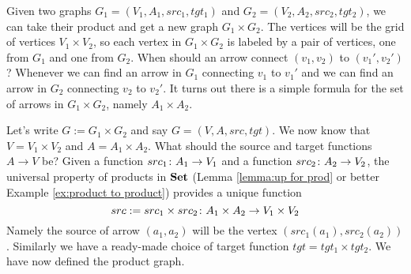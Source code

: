 \begin{example}\label{ex:product of graphs}
Given two graphs $G_1=(V_1,A_1,src_1,tgt_1)$ and $G_2=(V_2,A_2,src_2,tgt_2)$, we can take their product and get a new graph $G_1\times G_2$. The vertices will be the grid of vertices $V_1\times V_2$, so each vertex in $G_1\times G_2$ is labeled by a pair of vertices, one from $G_1$ and one from $G_2$. When should an arrow connect $(v_1,v_2)$ to $(v_1',v_2')$? Whenever we can find an arrow in $G_1$ connecting $v_1$ to $v_1'$ and we can find an arrow in $G_2$ connecting $v_2$ to $v_2'$. It turns out there is a simple formula for the set of arrows in $G_1\times G_2$, namely $A_1\times A_2$.

Let's write $G:=G_1\times G_2$ and say $G=(V,A,src,tgt)$. We now know that $V=V_1\times V_2$ and $A=A_1\times A_2$. What should the source and target functions $A\to V$ be? Given a function $src_1\colon A_1\rightarrow V_1$ and a function $src_2\colon A_2\rightarrow V_2$, the universal property of products in ${\bf Set}$ (Lemma \ref{lemma:up for prod} or better Example \ref{ex:product to product}) provides a unique function 
$$src:=src_1\times src_2\colon A_1\times A_2\rightarrow V_1\times V_2$$ 
Namely the source of arrow $(a_1,a_2)$ will be the vertex $(src_1(a_1),src_2(a_2))$. Similarly we have a ready-made choice of target function $tgt=tgt_1\times tgt_2$. We have now defined the product graph.


\end{example}
